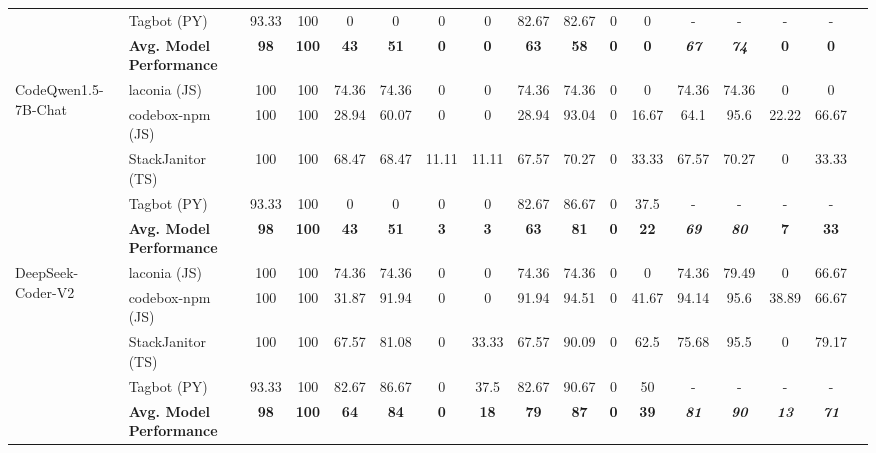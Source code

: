 \begin{table*}[htb!]
\begin{tabular}{|l|l|c|c|c|c|c|c|c|c|c|c|c|c|c|c|c|}
        \cline{2-16}
        & Tagbot (PY) & 93.33 & 100 & 0 & 0 & 0 & 0 & 82.67 & 82.67 & 0 & 0 & - & - & - & -\\
        \cline{2-16} 
        & \textbf{Avg. Model Performance} & \textbf{98}	& \textbf{100} & \textbf{43} & \textbf{51} & \textbf{0} & \textbf{0} & \textbf{63} & \textbf{58} & \textbf{0} & \textbf{0} & \textit{\textbf{67}} & \textit{\textbf{74}} & \textbf{0} & \textbf{0}\\
        \hline
        \multirow{5}{*}{CodeQwen1.5-7B-Chat} & laconia (JS) & 100 & 100 & 74.36 & 74.36 & 0 & 0 & 74.36 & 74.36 & 0 & 0 & 74.36 & 74.36 & 0 & 0 \\
        \cline{2-16}
        & codebox-npm (JS) & 100 & 100 & 28.94 & 60.07 & 0 & 0 & 28.94 & 93.04 & 0 & 16.67 & 64.1 & 95.6 & 22.22 & 66.67 \\
        \cline{2-16}
        & StackJanitor (TS) & 100 & 100 & 68.47 & 68.47 & 11.11 & 11.11 & 67.57 & 70.27 & 0 & 33.33 & 67.57 & 70.27 & 0 & 33.33 \\
        \cline{2-16}
        & Tagbot (PY) & 93.33 & 100 & 0 & 0 & 0 & 0 & 82.67 & 86.67 & 0 & 37.5 & - & - & - & -\\
        \cline{2-16} 
        & \textbf{Avg. Model Performance} & \textbf{98} & \textbf{100} & \textbf{43} & \textbf{51} & \textbf{3} & \textbf{3} & \textbf{63} & \textbf{81} & \textbf{0} & \textbf{22} & \textit{\textbf{69}} & \textit{\textbf{80}} & \textbf{7} & \textbf{33}\\
        \hline
        \multirow{5}{*}{DeepSeek-Coder-V2} & laconia (JS) & 100 & 100 & 74.36 & 74.36 & 0 & 0 & 74.36 & 74.36 & 0 & 0 & 74.36 & 79.49 & 0 & 66.67 \\
        \cline{2-16}
        & codebox-npm (JS) & 100 & 100 & 31.87 & 91.94 & 0 & 0 & 91.94 & 94.51 & 0 & 41.67 & 94.14 & 95.6 & 38.89 & 66.67 \\
        \cline{2-16}
        & StackJanitor (TS) & 100 & 100 & 67.57 & 81.08 & 0 & 33.33 & 67.57 & 90.09 & 0 & 62.5 & 75.68 & 95.5 & 0 & 79.17 \\
        \cline{2-16}
        & Tagbot (PY) & 93.33 & 100 & 82.67 & 86.67 & 0 & 37.5 & 82.67 & 90.67 & 0 & 50 & - & - & - & -\\
        \cline{2-16} 
        & \textbf{Avg. Model Performance}  & \textbf{98} & \textbf{100} & \textbf{64} & \textbf{84} & \textbf{0} & \textbf{18} & \textbf{79} & \textbf{87} & \textbf{0} & \textbf{39} & \textit{\textbf{81}} & \textit{\textbf{90}} & \textit{\textbf{13}} & \textit{\textbf{71}}\\

\end{tabular}
\end{table*}
